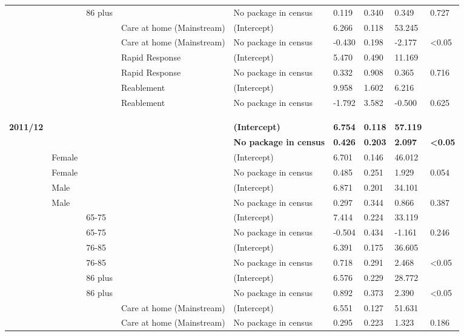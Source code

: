 \documentclass[]{article}
\begin{document}
\begin{landscape}
\begin{longtable}[c]{@{}lllllllll@{}}
 &  & 86 plus &  & No package in census & 0.119 & 0.340 & 0.349 & 0.727 \\
 &  &  & Care at home (Mainstream) & (Intercept) & 6.266 & 0.118 & 53.245 &  \\
 &  &  & Care at home (Mainstream) & No package in census & -0.430 & 0.198 & -2.177 & \textless{}0.05 \\
 &  &  & Rapid Response & (Intercept) & 5.470 & 0.490 & 11.169 &  \\
 &  &  & Rapid Response & No package in census & 0.332 & 0.908 & 0.365 & 0.716 \\
 &  &  & Reablement & (Intercept) & 9.958 & 1.602 & 6.216 &  \\
 &  &  & Reablement & No package in census & -1.792 & 3.582 & -0.500 & 0.625 \\
 \\
 \\
 \\
\textbf{2011/12} & \textbf{} & \textbf{} & \textbf{} & \textbf{(Intercept)} & \textbf{6.754} & \textbf{0.118} & \textbf{57.119} & \textbf{} \\
\textbf{} & \textbf{} & \textbf{} & \textbf{} & \textbf{No package in census} & \textbf{0.426} & \textbf{0.203} & \textbf{2.097} & \textbf{\textless{}0.05} \\
 & Female &  &  & (Intercept) & 6.701 & 0.146 & 46.012 &  \\
 & Female &  &  & No package in census & 0.485 & 0.251 & 1.929 & 0.054 \\
 & Male &  &  & (Intercept) & 6.871 & 0.201 & 34.101 &  \\
 & Male &  &  & No package in census & 0.297 & 0.344 & 0.866 & 0.387 \\
 &  & 65-75 &  & (Intercept) & 7.414 & 0.224 & 33.119 &  \\
 &  & 65-75 &  & No package in census & -0.504 & 0.434 & -1.161 & 0.246 \\
 &  & 76-85 &  & (Intercept) & 6.391 & 0.175 & 36.605 &  \\
 &  & 76-85 &  & No package in census & 0.718 & 0.291 & 2.468 & \textless{}0.05 \\
 &  & 86 plus &  & (Intercept) & 6.576 & 0.229 & 28.772 &  \\
 &  & 86 plus &  & No package in census & 0.892 & 0.373 & 2.390 & \textless{}0.05 \\
 &  &  & Care at home (Mainstream) & (Intercept) & 6.551 & 0.127 & 51.631 &  \\
 &  &  & Care at home (Mainstream) & No package in census & 0.295 & 0.223 & 1.323 & 0.186 \\

\end{longtable}
\end{landscape}
\end{document}
